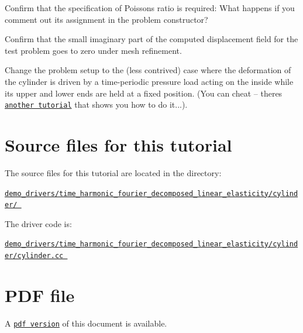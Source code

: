 \begin{DoxyItemize}
\item Confirm that the specification of Poisson\textquotesingle{}s ratio is required\+: What happens if you comment out its assignment in the problem constructor?
\item Confirm that the small imaginary part of the computed displacement field for the test problem goes to zero under mesh refinement.
\item Change the problem setup to the (less contrived) case where the deformation of the cylinder is driven by a time-\/periodic pressure load acting on the inside while its upper and lower ends are held at a fixed position. (You can cheat -- there\textquotesingle{}s \href{../../adaptive_pressure_loaded_cylinder/html/index.html}{\tt another tutorial} that shows you how to do it...).
\end{DoxyItemize}

 

\hypertarget{index_sources}{}\section{Source files for this tutorial}\label{index_sources}

\begin{DoxyItemize}
\item The source files for this tutorial are located in the directory\+: \begin{center} \href{../../../../demo_drivers/time_harmonic_fourier_decomposed_linear_elasticity/cylinder/}{\tt demo\+\_\+drivers/time\+\_\+harmonic\+\_\+fourier\+\_\+decomposed\+\_\+linear\+\_\+elasticity/cylinder/ } \end{center} 
\item The driver code is\+: \begin{center} \href{../../../../demo_drivers/time_harmonic_fourier_decomposed_linear_elasticity/cylinder/cylinder.cc}{\tt demo\+\_\+drivers/time\+\_\+harmonic\+\_\+fourier\+\_\+decomposed\+\_\+linear\+\_\+elasticity/cylinder/cylinder.\+cc } \end{center} 
\end{DoxyItemize}



 

 \hypertarget{index_pdf}{}\section{P\+D\+F file}\label{index_pdf}
A \href{../latex/refman.pdf}{\tt pdf version} of this document is available. 
